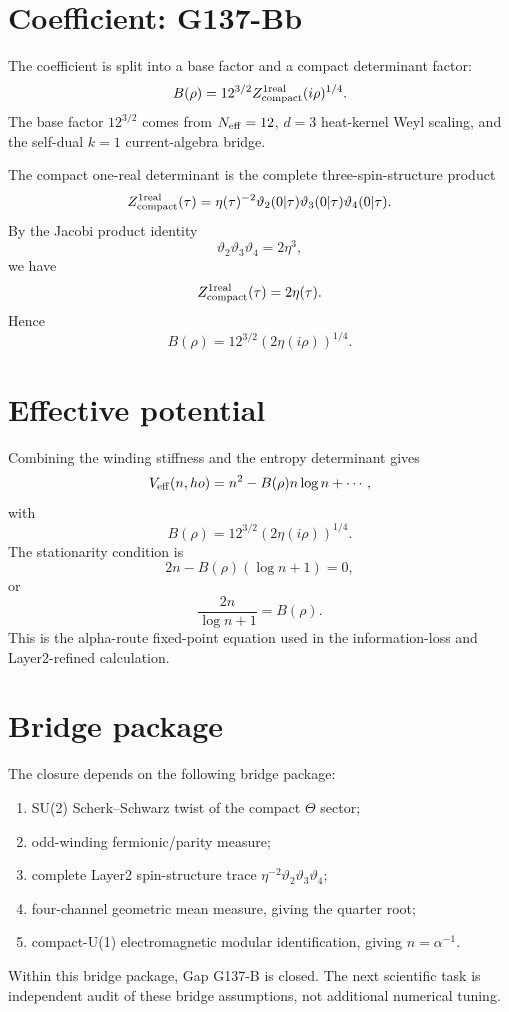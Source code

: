 \documentclass[12pt,a4paper]{article}
\begin{document}
\section{Coefficient: G137-Bb}

The coefficient is split into a base factor and a compact determinant factor:
\[
  B(\rho)=12^{3/2}Z_{\rm compact}^{1\rm real}(i\rho)^{1/4}.
\]
The base factor $12^{3/2}$ comes from $N_{\rm eff}=12$, $d=3$ heat-kernel Weyl
scaling, and the self-dual $k=1$ current-algebra bridge.

The compact one-real determinant is the complete three-spin-structure product
\[
  Z_{\rm compact}^{1\rm real}(\tau)
  =\eta(\tau)^{-2}\vartheta_2(0|\tau)\vartheta_3(0|\tau)\vartheta_4(0|\tau).
\]
By the Jacobi product identity
\[
  \vartheta_2\vartheta_3\vartheta_4=2\eta^3,
\]
we have
\[
  Z_{\rm compact}^{1\rm real}(\tau)=2\eta(\tau).
\]
Hence
\[
  B(\rho)=12^{3/2}(2\eta(i\rho))^{1/4}.
\]

\section{Effective potential}

Combining the winding stiffness and the entropy determinant gives
\[
  V_{\rm eff}(n,
ho)
  =n^2-B(\rho)n\log n+\cdots,
\]
with
\[
  B(\rho)=12^{3/2}(2\eta(i\rho))^{1/4}.
\]
The stationarity condition is
\[
  2n-B(\rho)(\log n+1)=0,
\]
or
\[
  \frac{2n}{\log n+1}=B(\rho).
\]
This is the alpha-route fixed-point equation used in the information-loss and
Layer2-refined calculation.

\section{Bridge package}

The closure depends on the following bridge package:
\begin{enumerate}
\item SU(2) Scherk--Schwarz twist of the compact $\Theta$ sector;
\item odd-winding fermionic/parity measure;
\item complete Layer2 spin-structure trace $\eta^{-2}\vartheta_2\vartheta_3\vartheta_4$;
\item four-channel geometric mean measure, giving the quarter root;
\item compact-U(1) electromagnetic modular identification, giving
  $n=\alpha^{-1}$.
\end{enumerate}
Within this bridge package, Gap G137-B is closed.  The next scientific task is
independent audit of these bridge assumptions, not additional numerical tuning.
\end{document}
